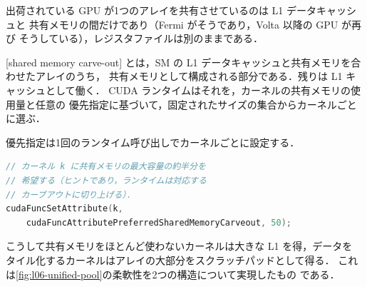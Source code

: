 \documentclass[../main.tex]{subfiles}
\begin{document}
%
出荷されている GPU が1つのアレイを共有させているのは L1 データキャッシュと
共有メモリの間だけであり（Fermi がそうであり，Volta 以降の GPU が再び
そうしている），レジスタファイルは別のままである．

\begin{definition}[共有メモリのカーブアウト]
  \label{def:l06-carveout}
  [shared memory carve-out]
  とは，SM の L1 データキャッシュと共有メモリを合わせたアレイのうち，
  共有メモリとして構成される部分である．残りは L1 キャッシュとして働く．
  CUDA ランタイムはそれを，カーネルの共有メモリの使用量と任意の
  優先指定に基づいて，固定されたサイズの集合からカーネルごとに選ぶ．
\end{definition}
%
優先指定は1回のランタイム呼び出しでカーネルごとに設定する．

\begin{lstlisting}[language=C++, numbers=none]
// カーネル k に共有メモリの最大容量の約半分を
// 希望する（ヒントであり，ランタイムは対応する
// カーブアウトに切り上げる）．
cudaFuncSetAttribute(k,
    cudaFuncAttributePreferredSharedMemoryCarveout, 50);
\end{lstlisting}

%
こうして共有メモリをほとんど使わないカーネルは大きな L1 を得，データを
タイル化するカーネルはアレイの大部分をスクラッチパッドとして得る．
これは\cref{fig:l06-unified-pool}の柔軟性を2つの構造について実現したもの
である．
\end{document}
